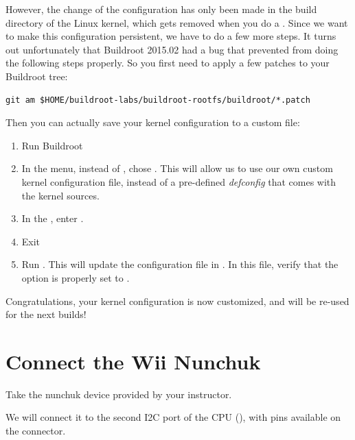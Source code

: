 However, the change of the configuration has only been made in the
build directory of the Linux kernel, which gets removed when you do a
. Since we want to make this configuration
persistent, we have to do a few more steps. It turns out unfortunately
that Buildroot 2015.02 had a bug that prevented from doing the
following steps properly. So you first need to apply a few patches to
your Buildroot tree:

\begin{verbatim}
git am $HOME/buildroot-labs/buildroot-rootfs/buildroot/*.patch
\end{verbatim}

Then you can actually save your kernel configuration to a custom file:

\begin{enumerate}

\item Run Buildroot 

\item In the  menu, instead of ,
  chose . This will allow us to use
  our own custom kernel configuration file, instead of a pre-defined
  {\em defconfig} that comes with the kernel sources.

\item In the , enter
  .

\item Exit 

\item Run . This will update the
  configuration file in
  . In this file,
  verify that the option  is properly
  set to .

\end{enumerate}

Congratulations, your kernel configuration is now customized, and will
be re-used for the next builds!

\section{Connect the Wii Nunchuk}

Take the nunchuk device provided by your instructor.

We will connect it to the second I2C port of the CPU (),
with pins available on the  connector.

